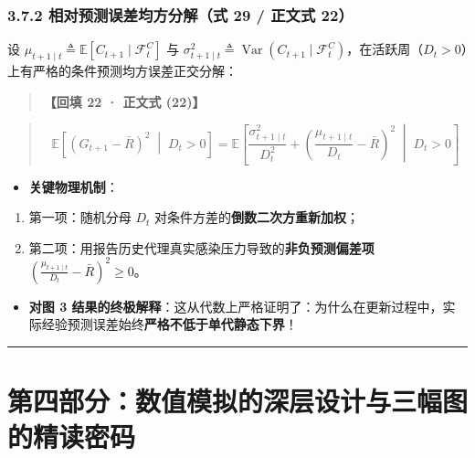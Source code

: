 \documentclass[11pt,a4paper]{ctexart}
\begin{document}
\subsubsection{3.7.2 相对预测误差均方分解（式 29 / 正文式 22）}
设 $\mu_{t+1 \mid t} \triangleq \mathbb{E}[C_{t+1} \mid \mathcal{F}_t^C]$ 与 $\sigma_{t+1 \mid t}^2 \triangleq \operatorname{Var}(C_{t+1} \mid \mathcal{F}_t^C)$，在活跃周（$D_t > 0$）上有严格的条件预测均方误差正交分解：


\begin{quote}\small\color{black!75}
\textbf{【回填 22 · 正文式 (22)】}
\end{quote}
\begin{quote}\small\color{black!75}
\begin{equation*}
\mathbb{E}\left[(G_{t+1} - \bar{R})^2 \;\middle|\; D_t > 0\right] = \mathbb{E}\left[\frac{\sigma_{t+1 \mid t}^2}{D_t^2} + \left(\frac{\mu_{t+1 \mid t}}{D_t} - \bar{R}\right)^2 \;\middle|\; D_t > 0\right] \tag{eq:exact\_renewal\_decomp}
\end{equation*}
\end{quote}

\begin{itemize}[leftmargin=2em, itemsep=2pt, parsep=0pt]
\item \textbf{关键物理机制}：
\end{itemize}
\begin{enumerate}[leftmargin=2em, itemsep=2pt, parsep=0pt]
\item 第一项：随机分母 $D_t$ 对条件方差的\textbf{倒数二次方重新加权}；
\item 第二项：用报告历史代理真实感染压力导致的\textbf{非负预测偏差项} $\left(\frac{\mu_{t+1 \mid t}}{D_t} - \bar{R}\right)^2 \ge 0$。
\end{enumerate}
\begin{itemize}[leftmargin=2em, itemsep=2pt, parsep=0pt]
\item \textbf{对图 3 结果的终极解释}：这从代数上严格证明了：为什么在更新过程中，实际经验预测误差始终\textbf{严格不低于单代静态下界}！
\end{itemize}

\vspace{0.8em}\hrule\vspace{0.8em}

\section{第四部分：数值模拟的深层设计与三幅图的精读密码}
\end{document}
